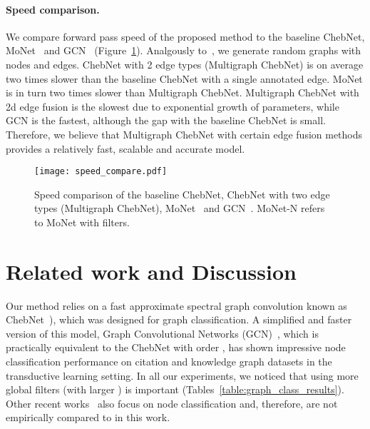 \documentclass[final,nonatbib]{article} \usepackage{nips_2018}
\begin{document}
	\paragraph{Speed comparison.}
	We compare forward pass speed of the proposed method to the baseline ChebNet, MoNet~\cite{monti2017geometric} and GCN~\cite{kipf2016semi} (Figure~\ref{fig:speed}). Analgously to~\cite{kipf2016semi}, we generate random graphs with  nodes and  edges. ChebNet with 2 edge types (Multigraph ChebNet) is on average two times slower than the baseline ChebNet with a single annotated edge. MoNet is in turn two times slower than Multigraph ChebNet. Multigraph ChebNet with 2d edge fusion is the slowest due to exponential growth of parameters, while GCN is the fastest, although the gap with the baseline ChebNet is small. Therefore, we believe that Multigraph ChebNet with certain edge fusion methods provides a relatively fast, scalable and accurate model.

	\begin{figure}[]
		\begin{center}
			\texttt{[image: speed\_compare.pdf]}
		\end{center}
		\caption{Speed comparison of the baseline ChebNet, ChebNet with two edge types (Multigraph ChebNet), MoNet~\cite{monti2017geometric} and GCN~\cite{kipf2016semi}. MoNet-N refers to MoNet with  filters.
		}
		\label{fig:speed}
	\end{figure}

	\section{Related work and Discussion}
	\label{sec:works}

	Our method relies on a fast approximate spectral graph convolution known as ChebNet~\cite{defferrard2016convolutional}), which was designed for graph classification. A simplified and faster version of this model, Graph Convolutional Networks (GCN)~\cite{kipf2016semi}, which is practically equivalent to the ChebNet with order , has shown impressive node classification performance on citation and knowledge graph datasets in the transductive learning setting. In all our experiments, we noticed that using more global filters (with larger ) is important (Tables~\ref{table:graph_class_results}).
	Other recent works~\cite{hamilton2017inductive, velickovic2017graph} also focus on node classification and, therefore, are not empirically compared to in this work.
\end{document}
